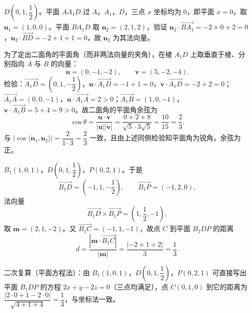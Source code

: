 \begin{answer}
$D\left(0,1,\dfrac12\right)$。平面 $AA_1D$ 过 $A$，$A_1$，$D$，三点 $x$ 坐标均为 $0$，即平面 $x=0$，取 $\boldsymbol n_1=(1,0,0)$。平面 $BA_1D$ 取 $\boldsymbol n_2=(2,1,2)$，验证 $\boldsymbol n_2\cdot\overrightarrow{BA_1}=-2+0+2=0$，$\boldsymbol n_2\cdot\overrightarrow{BD}=-2+1+1=0$，故 $\boldsymbol n_2$ 为其法向量。

为了定出二面角的平面角（而非两法向量的夹角），在棱 $A_1D$ 上取垂直于棱、分别指向 $A$ 与 $B$ 的向量：
\nopagebreak[4]
\[\boldsymbol u=(0,-1,-2),\qquad \boldsymbol v=(5,-2,-4).\]
检验：$\overrightarrow{A_1D}=\left(0,1,-\dfrac12\right)$，$\boldsymbol u\cdot\overrightarrow{A_1D}=-1+1=0$，$\boldsymbol v\cdot\overrightarrow{A_1D}=-2+2=0$；$\overrightarrow{A_1A}=(0,0,-1)$，$\boldsymbol u\cdot\overrightarrow{A_1A}=2>0$；$\overrightarrow{A_1B}=(1,0,-1)$，$\boldsymbol v\cdot\overrightarrow{A_1B}=5+4=9>0$。故二面角的平面角余弦为
\nopagebreak[4]
\[\cos\theta=\frac{\boldsymbol u\cdot\boldsymbol v}{|\boldsymbol u||\boldsymbol v|}=\frac{0+2+8}{\sqrt5\cdot3\sqrt5}=\frac{10}{15}=\frac23.\]
与 $|\cos\langle\boldsymbol n_1,\boldsymbol n_2\rangle|=\dfrac{2}{1\cdot3}=\dfrac23$ 一致，且由上述同侧检验知平面角为锐角，余弦为正。

$B_1(1,0,1)$，$D\left(0,1,\dfrac12\right)$，$P(0,2,1)$。于是
\nopagebreak[4]
\[\overrightarrow{B_1D}=\left(-1,1,-\frac12\right),\qquad \overrightarrow{B_1P}=(-1,2,0),\]
法向量
\nopagebreak[4]
\[\overrightarrow{B_1D}\times\overrightarrow{B_1P}=\left(1,\frac12,-1\right),\]
取 $\boldsymbol m=(2,1,-2)$。又 $\overrightarrow{B_1C}=(-1,1,-1)$，故点 $C$ 到平面 $B_1DP$ 的距离
\nopagebreak[4]
\[d=\frac{|\boldsymbol m\cdot\overrightarrow{B_1C}|}{|\boldsymbol m|}=\frac{|{-2+1+2}|}{3}=\frac13.\]

二次复算（平面方程法）：由 $B_1(1,0,1)$，$D\left(0,1,\dfrac12\right)$，$P(0,2,1)$ 可直接写出平面 $B_1DP$ 的方程 $2x+y-2z=0$（三点均满足），点 $C(0,1,0)$ 到它的距离为 $\dfrac{|2\cdot0+1-2\cdot0|}{\sqrt{4+1+4}}=\dfrac13$，与坐标法一致。




\end{answer}
